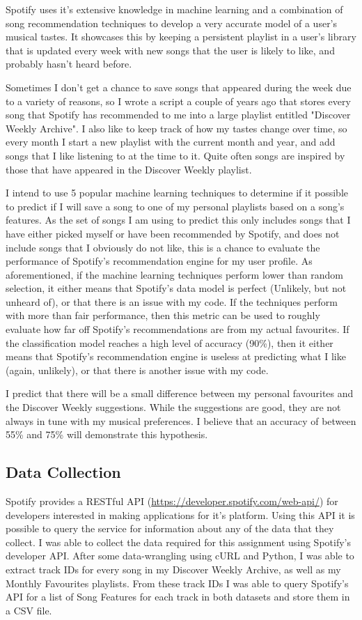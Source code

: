 \documentclass{article}
\begin{document}
		Spotify uses it's extensive knowledge in machine learning and a combination of song recommendation techniques to develop a very accurate model of a user's musical tastes. It showcases this by keeping a persistent playlist in a user's library that is updated every week with new songs that the user is likely to like, and probably hasn't heard before. 
		
		Sometimes I don't get a chance to save songs that appeared during the week due to a variety of reasons, so I wrote a script a couple of years ago that stores every song that Spotify has recommended to me into a large playlist entitled "Discover Weekly Archive". I also like to keep track of how my tastes change over time, so every month I start a new playlist with the current month and year, and add songs that I like listening to at the time to it. Quite often songs are inspired by those that have appeared in the Discover Weekly playlist.
		
		I intend to use 5 popular machine learning techniques to determine if it possible to predict if I will save a song to one of my personal playlists based on a song's features. As the set of songs I am using to predict this only includes songs that I have either picked myself or have been recommended by Spotify, and does not include songs that I obviously do not like, this is a chance to evaluate the performance of Spotify's recommendation engine for my user profile. As aforementioned, if the machine learning techniques perform lower than random selection, it either means that Spotify's data model is perfect (Unlikely, but not unheard of), or that there is an issue with my code. If the techniques perform with more than fair performance, then this metric can be used to roughly evaluate how far off Spotify's recommendations are from my actual favourites. If the classification model reaches a high level of accuracy (90\%), then it either means that Spotify's recommendation engine is useless at predicting what I like (again, unlikely), or that there is another issue with my code. 
		
		I predict that there will be a small difference between my personal favourites and the Discover Weekly suggestions. While the suggestions are good, they are not always in tune with my musical preferences. I believe that an accuracy of between 55\% and 75\% will demonstrate this hypothesis.

        \subsection{Data Collection}		
        Spotify provides a RESTful API (\url{https://developer.spotify.com/web-api/}) for developers interested in making applications for it's platform. Using this API it is possible to query the service for information about any of the data that they collect. 
        I was able to collect the data required for this assignment using Spotify's developer API. After some data-wrangling using cURL and Python, I was able to extract track IDs for every song in my Discover Weekly Archive, as well as my Monthly Favourites playlists. From these track IDs I was able to query Spotify's API for a list of Song Features for each track in both datasets and store them in a CSV file.
        
\end{document}
